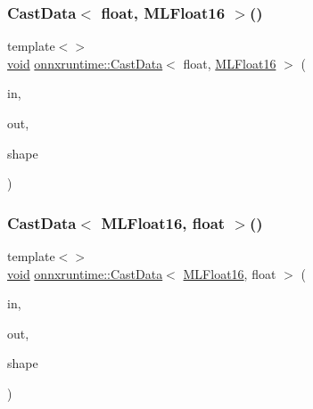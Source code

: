 \mbox{\label{namespaceonnxruntime_a37b25654aa97c897817c6b3a7a791a84}} 
\subsubsection{\texorpdfstring{Cast\+Data$<$ float, M\+L\+Float16 $>$()}{CastData< float, MLFloat16 >()}}
{\footnotesize\ttfamily template$<$$>$ \\
\mbox{\hyperlink{mlasi_8h_a88f941d423cb2a819b70a1358982b1a6}{void}} \mbox{\hyperlink{namespaceonnxruntime_a35e6aa9711c7a7b1cf830f0326d88633}{onnxruntime\+::\+Cast\+Data}}$<$ float, \mbox{\hyperlink{uniononnxruntime_1_1MLFloat16}{M\+L\+Float16}} $>$ (\begin{DoxyParamCaption}\item[{const \mbox{\hyperlink{classonnxruntime_1_1Tensor}{Tensor}} $\ast$}]{in,  }\item[{\mbox{\hyperlink{classonnxruntime_1_1Tensor}{Tensor}} $\ast$}]{out,  }\item[{const \mbox{\hyperlink{classonnxruntime_1_1TensorShape}{Tensor\+Shape}} \&}]{shape }\end{DoxyParamCaption})\hspace{0.3cm}{\ttfamily [inline]}}

\mbox{\label{namespaceonnxruntime_a46ff819df781b20c7a03ac47e42d5ea0}} 
\subsubsection{\texorpdfstring{Cast\+Data$<$ M\+L\+Float16, float $>$()}{CastData< MLFloat16, float >()}}
{\footnotesize\ttfamily template$<$$>$ \\
\mbox{\hyperlink{mlasi_8h_a88f941d423cb2a819b70a1358982b1a6}{void}} \mbox{\hyperlink{namespaceonnxruntime_a35e6aa9711c7a7b1cf830f0326d88633}{onnxruntime\+::\+Cast\+Data}}$<$ \mbox{\hyperlink{uniononnxruntime_1_1MLFloat16}{M\+L\+Float16}}, float $>$ (\begin{DoxyParamCaption}\item[{const \mbox{\hyperlink{classonnxruntime_1_1Tensor}{Tensor}} $\ast$}]{in,  }\item[{\mbox{\hyperlink{classonnxruntime_1_1Tensor}{Tensor}} $\ast$}]{out,  }\item[{const \mbox{\hyperlink{classonnxruntime_1_1TensorShape}{Tensor\+Shape}} \&}]{shape }\end{DoxyParamCaption})\hspace{0.3cm}{\ttfamily [inline]}}

